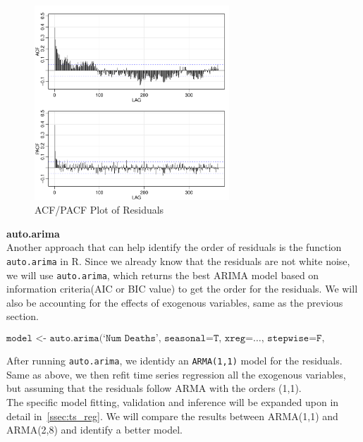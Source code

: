 \documentclass{article}\usepackage[]{graphicx}\usepackage[]{color}
\newenvironment{knitrout}{}{} %
\begin{document}
\begin{knitrout}
\color{fgcolor}\begin{figure}[H]

{\centering \includegraphics[width=0.65\textwidth]{figure/ts_2-1} 

}

\caption[ACF/PACF Plot of Residuals]{ACF/PACF Plot of Residuals}\label{fig:ts_2}
\end{figure}


\end{knitrout}

\noindent\textbf{auto.arima} \\
Another approach that can help identify the order of residuals is the function \texttt{auto.arima} in R. Since we already know that the residuals are not white noise, we will use \texttt{auto.arima}, which returns the best ARIMA model based on information criteria(AIC or BIC value) to get the order for the residuals. We will also be accounting for the effects of exogenous variables, same as the previous section. 

\begin{equation*}
    \texttt{model <- auto.arima(`Num Deaths', seasonal=T, xreg=\ldots, stepwise=F, approx=F, type=`none')}
\end{equation*}

After running \texttt{auto.arima}, we identidy an \texttt{ARMA(1,1)} model for the residuals. Same as above, we then refit time series regression all the exogenous variables, but assuming that the residuals follow ARMA with the orders (1,1).\\

The specific model fitting, validation and inference will be expanded upon in detail in~\autoref{ssec:ts_reg}. We will compare the results between ARMA(1,1) and ARMA(2,8) and identify a better model.
\end{document}
